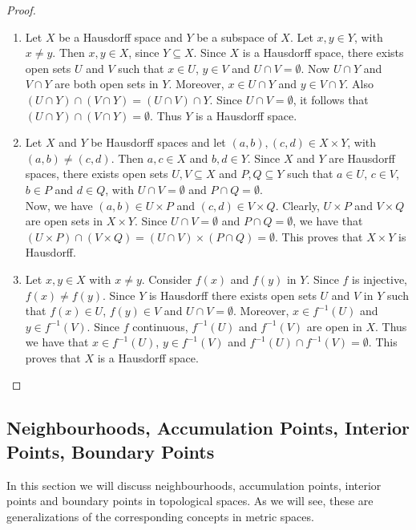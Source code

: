 \documentclass[11pt,a4paper]{article}
\theoremstyle{definition}
\begin{document}
\begin{proof}
\begin{enumerate}
\item[i).] Let $X$ be a Hausdorff space and $Y$ be a subspace of $X$. Let $x,y\in Y$, with $x\neq y$. Then $x,y\in X$, since $Y\subseteq X$. Since $X$ is a Hausdorff space, there exists open sets $U$ and $V$ such that $x\in U$, $y\in V$ and $U\cap V=\emptyset$. Now $U\cap Y$ and $V\cap Y$ are both open sets in $Y$. Moreover, $x\in U\cap Y$ and $y\in V\cap Y$. Also $(U\cap Y)\cap (V\cap Y)=(U\cap V)\cap Y$. Since $U\cap V=\emptyset$, it follows that $(U\cap Y)\cap (V\cap Y)=\emptyset$. Thus $Y$ is a Hausdorff space.

\item[ii).] Let $X$ and $Y$ be Hausdorff spaces and let $(a,b),(c,d)\in X\times Y$, with $(a,b)\neq (c,d)$. Then $a,c\in X$ and $b,d\in Y$. Since $X$ and $Y$ are Hausdorff spaces, there exists open sets $U,V\subseteq X$ and $P,Q\subseteq Y$ such that $a\in U$, $c\in V$, $b\in P$ and $d\in Q$, with $U\cap V=\emptyset$ and $P\cap Q=\emptyset$.\\
Now, we have $(a,b)\in U\times P$ and $(c,d)\in V\times Q$. Clearly, $U\times P$ and $V\times Q$ are open sets in $X\times Y$. Since $U\cap V=\emptyset$ and $P\cap Q=\emptyset$, we have that $(U\times P)\cap (V\times Q)=(U\cap V)\times (P\cap Q)=\emptyset$. This proves that $X\times Y$ is Hausdorff.

\item[iii).] Let $x,y\in X$ with $x\neq y$. Consider $f(x)$ and $f(y)$ in $Y$. Since $f$ is injective, $f(x)\neq f(y)$. Since $Y$ is Hausdorff there exists open sets $U$ and $V$ in $Y$ such that $f(x)\in U$, $f(y)\in V$ and $U\cap V=\emptyset$. Moreover, $x\in f^{-1}(U)$ and $y\in f^{-1}(V)$. Since $f$ continuous, $f^{-1}(U)$ and $f^{-1}(V)$ are open in $X$. Thus we have that $x\in f^{-1}(U)$, $y\in f^{-1}(V)$ and $f^{-1}(U)\cap f^{-1}(V)=\emptyset$. This proves that $X$ is a Hausdorff space.
\end{enumerate}
\end{proof}














\subsection{Neighbourhoods, Accumulation Points, Interior Points, Boundary Points}
In this section we will discuss neighbourhoods, accumulation points, interior points and boundary points in topological spaces. As we will see, these are generalizations of the corresponding concepts in metric spaces.
\end{document}
